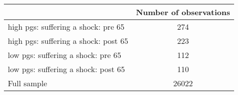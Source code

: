 % 
\begin{tabular}{lc}
  \toprule
 & Number of observations \\ 
  \midrule
high pgs: suffering a shock: pre 65 & 274 \\ 
   \midrule
high pgs: suffering a shock: post 65 & 223 \\ 
  low pgs: suffering a shock: pre 65 & 112 \\ 
  low pgs: suffering a shock: post 65 & 110 \\ 
  Full sample & 26022 \\ 
   \bottomrule
\end{tabular}
